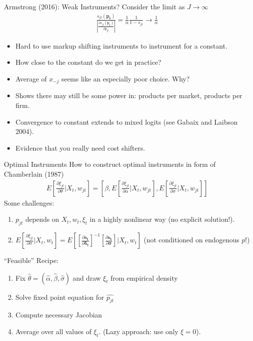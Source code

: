 \documentclass[xcolor=pdftex,dvipsnames,table,mathserif,aspectratio=169]{beamer}
\begin{document}
\begin{frame}{Armstrong (2016): Weak Instruments?}
Consider the limit as $J \rightarrow \infty$
\begin{eqnarray*}
\frac{s_{jt}(\mathbf{p_t})}{\left|\frac{\partial s_{jt}(\mathbf{p_t})}{\partial p_{jt}}\right|} = \frac{1}{\alpha} \frac{1}{1-s_{jt}} \rightarrow \frac{1}{\alpha}
\end{eqnarray*}
\begin{itemize}
\item Hard to use markup shifting instruments to instrument for a constant.
\item How close to the constant do we get in practice?
\item Average of $x_{-j}$ seems like an especially poor choice. Why?
\item Shows there may still be some power in: products per market, products per firm.
\item Convergence to constant extends to mixed logits (see Gabaix and Laibson 2004).
\item Evidence that you really need cost shifters.
\end{itemize}
\end{frame}

\begin{frame}{Optimal Instruments}
How to construct optimal instruments in form of Chamberlain (1987)
\begin{eqnarray*}
E\left[\frac{\partial \xi_{jt}}{\partial \theta} | X_t, w_{jt} \right] = \left[\beta, E\left[\frac{\partial \xi_{jt}}{\partial \alpha} | X_t, w_{jt} \right] , E[\frac{\partial \xi_{jt}}{\partial \sigma} | X_t, w_{jt} ] \right]
\end{eqnarray*}
Some challenges:
\begin{enumerate}
\item $p_{jt}$ depends on $X_{t}, w_{t}, \xi_{t}$ in a highly nonlinear way (no explicit solution!).
\item $E[\frac{\partial \xi_{jt}}{\partial \sigma} | X_t, w_{t} ] =E[[\frac{\partial \mathbf{s_t}}{\partial \mathbf{\delta_t}}]^{-1} [\frac{\partial \mathbf{s_t}}{\partial \mathbf{\sigma}}] | X_t, w_{t} ]$  (not conditioned on endogenous $p$!)
\end{enumerate}
``Feasible'' Recipe:
\begin{enumerate}
\item Fix $\hat{\theta}=(\hat{\alpha},\hat{\beta},\hat{\sigma})$ and draw $\xi_t$ from empirical density
\item Solve fixed point equation for $\hat{p_{jt}}$
\item Compute necessary Jacobian
\item Average over all values of $\xi_t$. (Lazy approach: use only $\xi =0$).
\end{enumerate}
\end{frame}
\end{document}
